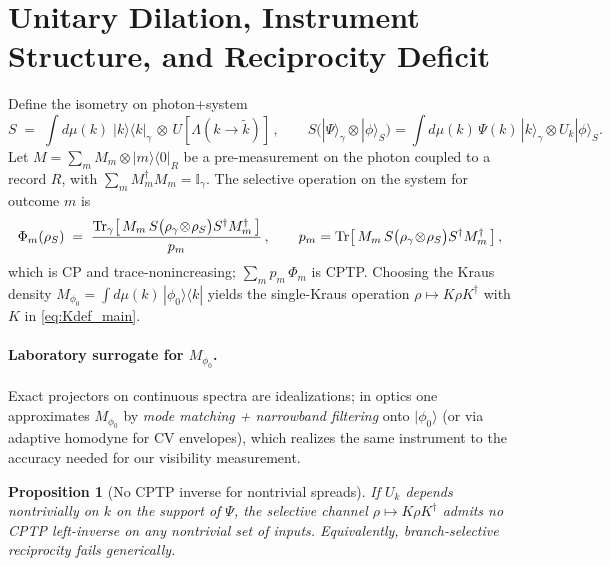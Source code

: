 \documentclass[aps,11pt]{article}
\providecommand{\bra}[1]{\langle #1|}
\providecommand{\ket}[1]{|#1\rangle}
\newtheorem{prop}{Proposition}
\begin{document}
\section{Unitary Dilation, Instrument Structure, and Reciprocity Deficit}\label{app:F}
Define the isometry on photon+system
\begin{equation}
S \;=\; \int d\mu(k)\;\ket{k}\!\bra{k}_\gamma \,\otimes\, U[\Lambda(k\!\to\!\tilde k)]\,,
\qquad
S\big(\ket{\Psi}_\gamma\!\otimes\!\ket{\phi}_S\big)=\int d\mu(k)\,\Psi(k)\,\ket{k}_\gamma\otimes U_k\ket{\phi}_S.
\end{equation}
Let \(M=\sum_m M_m\otimes\ket{m}\!\bra{0}_R\) be a pre-measurement on the photon coupled to a record \(R\), with \(\sum_m M_m^\dagger M_m=\mathbb I_\gamma\). The selective operation on the system for outcome \(m\) is
\begin{equation}\label{eq:instrument}
\Phi_m(\rho_S)\;=\;\frac{\Tr_{\gamma}\!\left[\,M_m\,S\big(\rho_\gamma\!\otimes\!\rho_S\big)S^\dagger M_m^\dagger\,\right]}{p_m}\,,\qquad
p_m=\Tr\!\left[\,M_m\,S\big(\rho_\gamma\!\otimes\!\rho_S\big)S^\dagger M_m^\dagger\,\right],
\end{equation}
which is CP and trace-nonincreasing; \(\sum_m p_m\,\Phi_m\) is CPTP. Choosing the Kraus density \(M_{\phi_0}=\int d\mu(k)\,\ket{\phi_0}\!\bra{k}\) yields the single-Kraus operation \(\rho\mapsto K\rho K^\dagger\) with \(K\) in \eqref{eq:Kdef_main}.

\paragraph{Laboratory surrogate for \(M_{\phi_0}\).}
Exact projectors on continuous spectra are idealizations; in optics one approximates \(M_{\phi_0}\) by \emph{mode matching + narrowband filtering} onto \(\ket{\phi_0}\) (or via adaptive homodyne for CV envelopes), which realizes the same instrument to the accuracy needed for our visibility measurement.

\begin{prop}[No CPTP inverse for nontrivial spreads]\label{prop:inverse}
If \(U_k\) depends nontrivially on \(k\) on the support of \(\Psi\), the selective channel \(\rho\mapsto K\rho K^\dagger\) admits no CPTP left-inverse on any nontrivial set of inputs. Equivalently, branch-selective reciprocity fails generically.
\end{prop}
\end{document}
